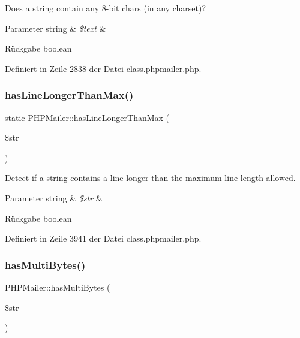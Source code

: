 Does a string contain any 8-\/bit chars (in any charset)? 
\begin{DoxyParams}[1]{Parameter}
string & {\em \$text} & \\
\hline
\end{DoxyParams}
\begin{DoxyReturn}{Rückgabe}
boolean 
\end{DoxyReturn}


Definiert in Zeile 2838 der Datei class.\+phpmailer.\+php.

\mbox{\label{class_p_h_p_mailer_affe5b2756b810d299d33643b7e731409}} 
\subsubsection{\texorpdfstring{has\+Line\+Longer\+Than\+Max()}{hasLineLongerThanMax()}}
{\footnotesize\ttfamily static P\+H\+P\+Mailer\+::has\+Line\+Longer\+Than\+Max (\begin{DoxyParamCaption}\item[{}]{\$str }\end{DoxyParamCaption})\hspace{0.3cm}{\ttfamily [static]}}

Detect if a string contains a line longer than the maximum line length allowed. 
\begin{DoxyParams}[1]{Parameter}
string & {\em \$str} & \\
\hline
\end{DoxyParams}
\begin{DoxyReturn}{Rückgabe}
boolean 
\end{DoxyReturn}


Definiert in Zeile 3941 der Datei class.\+phpmailer.\+php.

\mbox{\label{class_p_h_p_mailer_ab78b7aaec42fe0f883be15b03dea3f08}} 
\subsubsection{\texorpdfstring{has\+Multi\+Bytes()}{hasMultiBytes()}}
{\footnotesize\ttfamily P\+H\+P\+Mailer\+::has\+Multi\+Bytes (\begin{DoxyParamCaption}\item[{}]{\$str }\end{DoxyParamCaption})}


